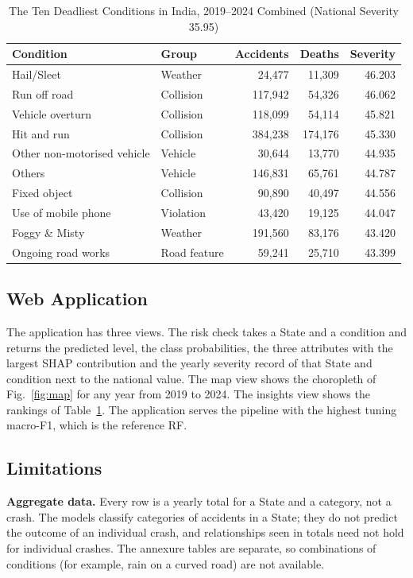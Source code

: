 \documentclass[conference]{IEEEtran}
\begin{document}
\begin{table}[t]
\caption{The Ten Deadliest Conditions in India, 2019--2024 Combined (National Severity 35.95)}
\label{tab:deadliest}
\centering
\footnotesize
\setlength{\tabcolsep}{3.5pt}
\begin{tabular}{@{}p{2.5cm}p{1.2cm}rrr@{}}
\toprule
Condition & Group & Accidents & Deaths & Severity \\
\midrule
Hail/Sleet & Weather & 24,477 & 11,309 & 46.203 \\
Run off road & Collision & 117,942 & 54,326 & 46.062 \\
Vehicle overturn & Collision & 118,099 & 54,114 & 45.821 \\
Hit and run & Collision & 384,238 & 174,176 & 45.330 \\
Other non-motorised vehicle & Vehicle & 30,644 & 13,770 & 44.935 \\
Others & Vehicle & 146,831 & 65,761 & 44.787 \\
Fixed object & Collision & 90,890 & 40,497 & 44.556 \\
Use of mobile phone & Violation & 43,420 & 19,125 & 44.047 \\
Foggy \& Misty & Weather & 191,560 & 83,176 & 43.420 \\
Ongoing road works & Road feature & 59,241 & 25,710 & 43.399 \\
\bottomrule
\end{tabular}
\end{table}

\subsection{Web Application}
The application has three views. The risk check takes a State and a condition and returns the predicted level, the class probabilities, the three attributes with the largest SHAP contribution and the yearly severity record of that State and condition next to the national value. The map view shows the choropleth of Fig.~\ref{fig:map} for any year from 2019 to 2024. The insights view shows the rankings of Table~\ref{tab:deadliest}. The application serves the pipeline with the highest tuning macro-F1, which is the reference RF.

\subsection{Limitations}
\textbf{Aggregate data.} Every row is a yearly total for a State and a category, not a crash. The models classify categories of accidents in a State; they do not predict the outcome of an individual crash, and relationships seen in totals need not hold for individual crashes. The annexure tables are separate, so combinations of conditions (for example, rain on a curved road) are not available.
\end{document}
